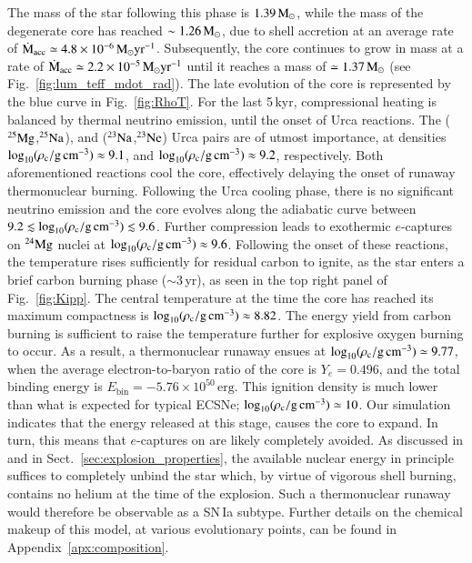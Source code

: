 \documentclass[main.tex]{subfiles}
\begin{document}
The  mass of the star following this phase is $1.39\mathrm{\,M_\odot}$, 
while the mass of the degenerate core has reached  $\sim 1.26\mathrm{\,M_\odot}$, due to shell accretion 
at an average rate of $\rm \dot{M}_{\rm acc} \simeq 4.8 \times 10^{-6} \mathrm{\,M_\odot} yr^{-1}$. 
Subsequently, the core continues to grow in mass at a rate 
of $\rm \dot{M}_{\rm acc} \simeq 2.2 \times 10^{-5} \mathrm{\,M_\odot} yr^{-1}$ 
until it reaches a  mass  of $\simeq 1.37\mathrm{\,M_\odot}$ (see Fig.~\ref{fig:lum_teff_mdot_rad}). 
The late evolution of the core is represented by the blue curve in Fig.~\ref{fig:RhoT}. 
For the last 5\,kyr, compressional heating is balanced by thermal 
neutrino emission, until the onset of Urca 
reactions. The ($\rm ^{25}Mg$,$\rm ^{25}Na$), and ($\rm ^{23}Na$,$\rm ^{23}Ne$) Urca pairs are of utmost importance, at 
densities $\rm \log_{10} (\rho_{\mathrm{c}}/ \mathrm{g\,cm^{-3}}) \approx 9.1$, and 
$\rm \log_{10} (\rho_{\mathrm{c}}/ \mathrm{g\,cm^{-3}}) \approx 9.2$, respectively. 
Both aforementioned reactions cool the core, effectively delaying the onset of runaway thermonuclear burning. 
Following the Urca cooling phase, there is no significant neutrino emission and the 
core evolves along the adiabatic curve 
between $9.2 \lesssim \log_{10} (\rho_{\mathrm{c}}/ \mathrm{g\,cm^{-3}}) \lesssim 9.6$. 
Further compression leads to exothermic $e$-captures on $\rm ^{24}Mg$ nuclei at $\rm \log_{10} (\rho_{\mathrm{c}}/ \mathrm{g\,cm^{-3}}) \approx 9.6$. 
Following the onset of these reactions, the temperature rises sufficiently for residual carbon to ignite, as the star enters a brief carbon burning phase ($\sim$3\,yr),
as seen in the top right panel of Fig.~\ref{fig:Kipp}.
The central temperature at the time the core has reached its maximum compactness is $\rm \log_{10} (\rho_{\mathrm{c}}/ \mathrm{g\,cm^{-3}}) \approx 8.82$. 
The energy yield from carbon burning is sufficient to raise the temperature further for 
explosive oxygen burning  to occur. As a result, a thermonuclear runaway ensues at 
$\log_{10} (\rho_{\mathrm{c}}/ \mathrm{g\,cm^{-3}}) \simeq 9.77$, when the average electron-to-baryon ratio of the core is 
$Y_e = 0.496$, and  the total binding energy is $E_{\text{bin}} = - 5.76 \times 10^{50}\,\text{erg}$. 
This ignition density is much lower than what is expected for typical ECSNe; $\log_{10} (\rho_{\mathrm{c}}/ \mathrm{g\,cm^{-3}}) \simeq 10$. 
Our simulation indicates that the energy released at this stage, causes the core to expand.
In turn, this means that $e$-captures on  are likely completely avoided.  
As discussed in  and in Sect.~\ref{sec:explosion_properties}, 
the available nuclear energy in principle suffices to completely unbind the star which, 
by virtue of vigorous shell burning, contains no helium at the time of the explosion. 
Such a thermonuclear runaway would therefore be observable as a SN\,Ia subtype. 
Further details on the chemical makeup of this model, at various 
evolutionary points, can be found in Appendix~\ref{apx:composition}.
\end{document}
